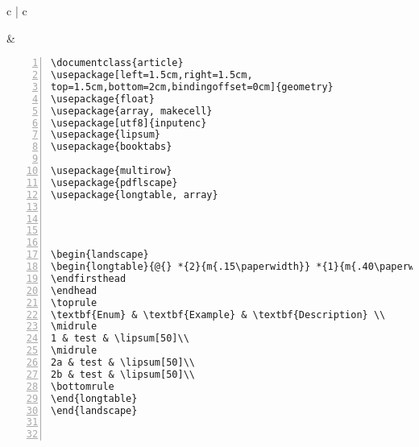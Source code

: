 \begin{tabular}{c | c}
\begin{minipage}[m]{0.4\textwidth}
\end{minipage}
&
\begin{minipage}[m]{0.55\textwidth}
\renewcommand\textminus{\mbox{-}}%
\begin{lstlisting}[numberstyle=\zebra{green!15}{yellow!15},numbers=left,basicstyle=\footnotesize] 
\documentclass{article}
\usepackage[left=1.5cm,right=1.5cm,
top=1.5cm,bottom=2cm,bindingoffset=0cm]{geometry}
\usepackage{float}
\usepackage{array, makecell}
\usepackage[utf8]{inputenc}
\usepackage{lipsum}
\usepackage{booktabs}

\usepackage{multirow}
\usepackage{pdflscape}
\usepackage{longtable, array}




\begin{landscape}
\begin{longtable}{@{} *{2}{m{.15\paperwidth}} *{1}{m{.40\paperwidth}} @{}}
\endfirsthead
\endhead
\toprule
\textbf{Enum} & \textbf{Example} & \textbf{Description} \\
\midrule
1 & test & \lipsum[50]\\
\midrule
2a & test & \lipsum[50]\\
2b & test & \lipsum[50]\\
\bottomrule
\end{longtable}
\end{landscape}

          
\end{lstlisting}
\end{minipage}
\end{tabular}

